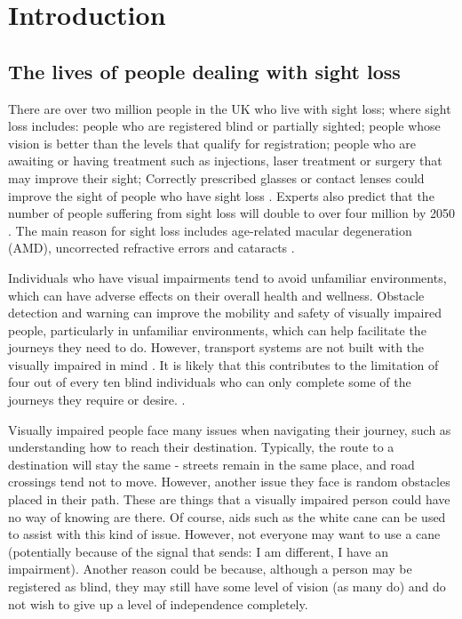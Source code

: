 \documentclass{svproc}
\begin{document}
\section{Introduction}
\subsection{The lives of people dealing with sight loss}
There are over two million people in the UK who live with sight loss; where sight loss includes: 
people who are registered blind or partially sighted; people whose vision is better than the levels that 
qualify for registration; people who are awaiting or having treatment such as injections, laser treatment or 
surgery that may improve their sight; Correctly prescribed glasses or contact lenses could improve 
the sight of people who have sight loss \cite{b1}. Experts also predict that the number of people 
suffering from sight loss will double to over four million by 2050 \cite{b2}. The main reason for 
sight loss includes age-related macular degeneration (AMD), uncorrected refractive errors and cataracts \cite{b1}. 

Individuals who have visual impairments tend to avoid unfamiliar environments, which can have adverse effects 
on their overall health and wellness. Obstacle detection and warning can improve the mobility and safety of 
visually impaired people, particularly in unfamiliar environments, which can help facilitate the journeys they 
need to do. However, transport systems are not built with the visually impaired in mind \cite{b2}. 
It is likely that this contributes to the limitation of four out of every ten blind individuals who can 
only complete some of the journeys they require or desire. \cite{b1}.

Visually impaired people face many issues when navigating their journey, such as understanding 
how to reach their destination. Typically, the route to a destination will stay the same - streets 
remain in the same place, and road crossings tend not to move. However, another issue they face is 
random obstacles placed in their path. These are things that a visually impaired person could have no way 
of knowing are there. Of course, aids such as the white cane can be used to assist with this kind of issue. 
However, not everyone may want to use a cane (potentially because of the signal that sends: I am different, I have an impairment). 
Another reason could be because, although a person may be registered as blind, they may still have some 
level of vision (as many do) and do not wish to give up a level of independence completely. 
\end{document}
